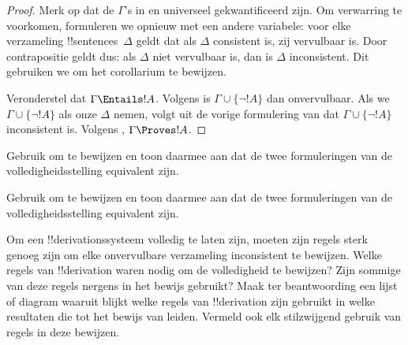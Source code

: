\documentclass[../../../include/open-logic-section]{subfiles}
\begin{document}
\begin{proof}
Merk op dat de $\Gamma$'s in  en
 universeel gekwantificeerd zijn. Om verwarring
te voorkomen, formuleren we  opnieuw met een
andere variabele: voor elke verzameling !!{sentence}s~$\Delta$ geldt dat
als $\Delta$ consistent is, zij vervulbaar is. Door contrapositie geldt
dus: als $\Delta$ niet vervulbaar is, dan is $\Delta$ inconsistent. Dit
gebruiken we om het corollarium te bewijzen.

Veronderstel dat $\Gamma \Entails !A$. Volgens
 is $\Gamma \cup \{\lnot !A\}$ dan
onvervulbaar. Als we $\Gamma \cup \{\lnot !A\}$ als onze $\Delta$ nemen,
volgt uit de vorige formulering van  dat
$\Gamma \cup \{\lnot !A\}$ inconsistent is. Volgens
,
$\Gamma \Proves !A$.
\end{proof}

\begin{prob}
Gebruik  om
 te bewijzen en toon daarmee aan
dat de twee formuleringen van de volledigheidsstelling equivalent zijn.
\end{prob}
\tagendprob

\begin{prob}
Gebruik  om
 te bewijzen en toon daarmee aan
dat de twee formuleringen van de volledigheidsstelling equivalent zijn.
\end{prob}
\tagendprob

\begin{prob}
Om een !!{derivation}ssysteem volledig te laten zijn, moeten zijn regels
sterk genoeg zijn om elke onvervulbare verzameling inconsistent te
bewijzen. Welke regels van !!{derivation} waren nodig om de volledigheid
te bewijzen? Zijn sommige van deze regels nergens in het bewijs gebruikt?
Maak ter beantwoording een lijst of diagram waaruit blijkt welke regels
van !!{derivation} zijn gebruikt in welke resultaten die tot het bewijs
van  leiden. Vermeld ook elk
stilzwijgend gebruik van regels in deze bewijzen.
\end{prob}
\tagendprob
\end{document}
